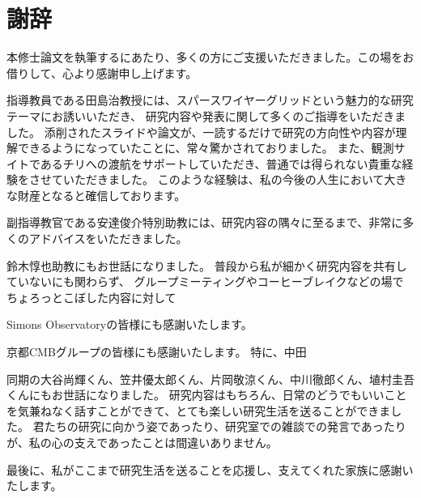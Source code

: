 \documentclass[../../main.tex]{subfiles}
\begin{document}
\chapter*{謝辞}
本修士論文を執筆するにあたり、多くの方にご支援いただきました。この場をお借りして、心より感謝申し上げます。


指導教員である田島治教授には、スパースワイヤーグリッドという魅力的な研究テーマにお誘いいただき、
研究内容や発表に関して多くのご指導をいただきました。
添削されたスライドや論文が、一読するだけで研究の方向性や内容が理解できるようになっていたことに、常々驚かされておりました。
また、観測サイトであるチリへの渡航をサポートしていただき、普通では得られない貴重な経験をさせていただきました。
このような経験は、私の今後の人生において大きな財産となると確信しております。

副指導教官である安達俊介特別助教には、研究内容の隅々に至るまで、非常に多くのアドバイスをいただきました。


鈴木惇也助教にもお世話になりました。
普段から私が細かく研究内容を共有していないにも関わらず、
グループミーティングやコーヒーブレイクなどの場でちょろっとこぼした内容に対して

Simons Observatoryの皆様にも感謝いたします。

京都CMBグループの皆様にも感謝いたします。
特に、中田

同期の大谷尚輝くん、笠井優太郎くん、片岡敬涼くん、中川徹郎くん、埴村圭吾くんにもお世話になりました。
研究内容はもちろん、日常のどうでもいいことを気兼ねなく話すことができて、とても楽しい研究生活を送ることができました。
君たちの研究に向かう姿であったり、研究室での雑談での発言であったりが、私の心の支えであったことは間違いありません。

最後に、私がここまで研究生活を送ることを応援し、支えてくれた家族に感謝いたします。
\end{document}
